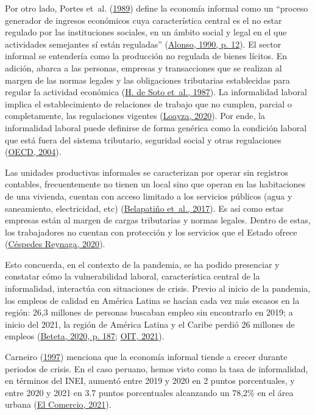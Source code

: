 \documentclass[
  letterpaper,
  12pt,
  oneside,
  spanish,
  doublespacing,
  headsepline,
  parskip]{MastersDoctoralThesis}
\begin{document}
Por otro lado, Portes et~al. (\protect\hyperlink{ref-theinfo1989}{1989})
define la economía informal como un ``proceso generador de ingresos
económicos cuya característica central es el no estar regulado por las
instituciones sociales, en un ámbito social y legal en el que
actividades semejantes sí están reguladas''
(\protect\hyperlink{ref-alonso1990}{Alonso, 1990, p. 12}). El sector
informal se entendería como la producción no regulada de bienes lícitos.
En adición, abarca a las personas, empresas y transacciones que se
realizan al margen de las normas legales y las obligaciones tributarias
establecidas para regular la actividad económica
(\protect\hyperlink{ref-desoto1987}{H. de Soto et~al., 1987}). La
informalidad laboral implica el establecimiento de relaciones de trabajo
que no cumplen, parcial o completamente, las regulaciones vigentes
(\protect\hyperlink{ref-loayza2020}{Loayza, 2020}). Por ende, la
informalidad laboral puede definirse de forma genérica como la condición
laboral que está fuera del sistema tributario, seguridad social y otras
regulaciones (\protect\hyperlink{ref-oecd2004}{OECD, 2004}).

Las unidades productivas informales se caracterizan por operar sin
registros contables, frecuentemente no tienen un local sino que operan
en las habitaciones de una vivienda, cuentan con acceso limitado a los
servicios públicos (agua y saneamiento, electricidad, etc)
(\protect\hyperlink{ref-belapatiuxf1o2017}{Belapatiño et~al., 2017}). Es
así como estas empresas están al margen de cargas tributarias y normas
legales. Dentro de estas, los trabajadores no cuentan con protección y
los servicios que el Estado ofrece
(\protect\hyperlink{ref-cuxe9spedesreynaga2020}{Céspedes Reynaga,
2020}).

Esto concuerda, en el contexto de la pandemia, se ha podido presenciar y
constatar cómo la vulnerabilidad laboral, característica central de la
informalidad, interactúa con situaciones de crisis. Previo al inicio de
la pandemia, los empleos de calidad en América Latina se hacían cada vez
más escasos en la región: 26,3 millones de personas buscaban empleo sin
encontrarlo en 2019; a inicio del 2021, la región de América Latina y el
Caribe perdió 26 millones de empleos
(\protect\hyperlink{ref-beteta2020}{Beteta, 2020, p. 187};
\protect\hyperlink{ref-oit2021}{OIT, 2021}).

Carneiro (\protect\hyperlink{ref-carneiro1997}{1997}) menciona que la
economía informal tiende a crecer durante periodos de crisis. En el caso
peruano, hemos visto como la tasa de informalidad, en términos del INEI,
aumentó entre 2019 y 2020 en 2 puntos porcentuales, y entre 2020 y 2021
en 3.7 puntos porcentuales alcanzando un 78,2\% en el área urbana
(\protect\hyperlink{ref-elcomercio2021}{El Comercio, 2021}).
\end{document}
